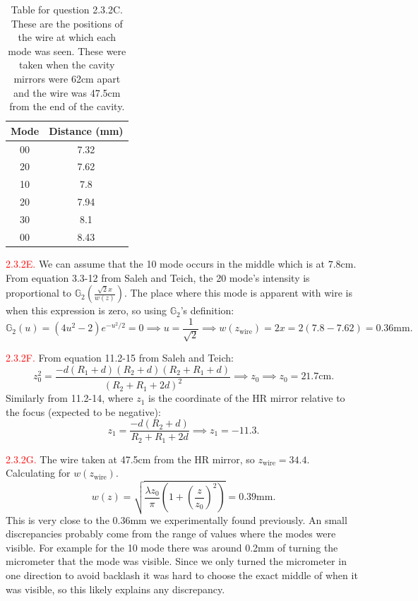 \documentclass[letterpaper, reqno,11pt]{article}
\begin{document}
\begin{table}[tb]
    \centering
    \caption{Table for question 2.3.2C. These are the positions of the wire at which each mode was seen. These were taken when the cavity mirrors were 62cm apart and the wire was 47.5cm from the end of the cavity.}
    \label{tab:label}
    \begin{tabular}{|c|c|}
    \hline
    Mode&Distance (mm)\\
    \hline
    00&7.32\\
    20&7.62\\
    10&7.8\\
    20&7.94\\
    30&8.1\\
    00&8.43\\
    \hline
    \end{tabular}
\end{table}

\noindent \textcolor{red}{2.3.2E.} We can assume that the 10 mode occurs in the middle which is at $7.8$cm. From equation 3.3-12 from Saleh and Teich, the 20 mode's intensity is proportional to $\mathbb G_{2}\left(\frac{\sqrt{2}x}{w(z)}\right)$. The place where this mode is apparent with wire is when this expression is zero, so using $\mathbb G_2$'s definition:
\[
\mathbb G_2(u)=(4u^2-2)e^{-u^2 /2}=0\implies u=\frac{1}{\sqrt{2}}\implies w(z_{\text{wire}})=2x=2\left( 7.8-7.62 \right) =0.36\text{mm}
.\]

\noindent \textcolor{red}{2.3.2F.} From equation 11.2-15 from Saleh and Teich:
\[
z_0^2= \frac{-d(R_1+d)(R_2+d)(R_2+R_1+d)}{\left( R_2+R_1+2d \right) ^2}\implies z_0\implies z_0=21.7\text{cm}
.\]
Similarly from 11.2-14, where $z_1$ is the coordinate of the HR mirror relative to the focus (expected to be negative):
\[
z_1= \frac{-d(R_2+d)}{R_2+R_1+2d}\implies z_1=-11.3
.\]

\noindent \textcolor{red}{2.3.2G.} The wire taken at 47.5cm from the HR mirror, so $z_\text{wire}=34.4$. Calculating for $w(z_{\text{wire}})$.
\[
w(z)=\sqrt{\frac{\lambda z_0}{\pi}\left( 1+\left( \frac{z}{z_0} \right) ^2 \right) }=0.39\text{mm}
.\]
This is very close to the 0.36mm we experimentally found previously. An small discrepancies probably come from the range of values where the modes were visible. For example for the 10 mode there was around 0.2mm of turning the micrometer that the mode was visible. Since we only turned the micrometer in one direction to avoid backlash it was hard to choose the exact middle of when it was visible, so this likely explains any discrepancy.
\end{document}
